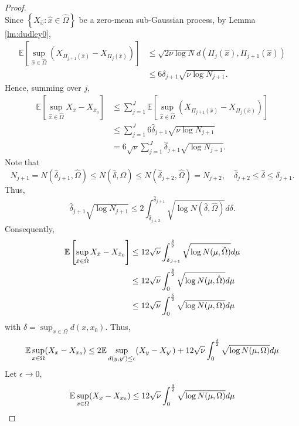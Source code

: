 \begin{proof}
$$$$
Since $\left\{X_{\hat x}: \hat x \in \hat \Omega\right\}$ be a zero-mean sub-Gaussian process, by Lemma \ref{lm:dudley0},
\begin{equation}
\begin{split}
\mathbb{E}\left [ \sup_{\hat x\in \hat \Omega} (X_{\Pi_{j+1} (\hat x)} - X_{\Pi_j (\hat x)})\right]
&\le \sqrt{2 \nu \log N}d(\Pi_j(\hat x), \Pi_{j+1}(\hat x)) 
\\
&\le 6\delta_{j+1}\sqrt{\nu \log N_{j+1}}.
\end{split}
\end{equation}
Hence, summing over $j$,
\begin{equation}
\begin{split}
\mathbb{E}\left [ \sup_{\hat x\in \hat \Omega} X_{\hat x} - X_{\hat x_0}\right]
&\le \sum_{j=1}^J \mathbb{E}\left [ \sup_{\hat x\in\hat  \Omega} (X_{\Pi_{j+1} (\hat x)} - X_{\Pi_j (\hat x)})\right]
\\
&\le \sum_{j=1}^J 6\hat \delta_{j+1}\sqrt{\nu \log N_{j+1}}
\\
& = 6\sqrt{\nu}\sum_{j=1}^J \hat \delta_{j+1}\sqrt{\log N_{j+1}}.
\end{split}
\end{equation}
Note that 
\begin{equation}
N_{j+1}=N(\hat \delta_{j+1}, \hat \Omega)\le N(\hat \delta, \hat \Omega) \le N(\hat{\delta}_{j+2}, \hat \Omega)=N_{j+2},\quad \hat \delta_{j+2}\le \hat \delta \le \delta_{j+1}.
\end{equation}
Thus,
\begin{equation}
\hat \delta_{j+1}\sqrt{\log N_{j+1}}\le 2\int^{\hat \delta_{j+1}}_{\hat \delta_{j+2}} \sqrt{ \log N(\hat \delta, \hat \Omega) }d\delta.
\end{equation}
Consequently,
\begin{equation}
\begin{split}
\mathbb{E}\left [ \sup_{\hat x\in \hat \Omega} X_{\hat x} - X_{\hat x_0}\right]
&\le 12\sqrt{\nu} \int^{\hat \delta\over 2}_{\hat \delta_{J+1}}\sqrt{\log N(\mu, \hat \Omega) }d\mu
\\
&\le 12\sqrt{\nu} \int^{\hat \delta\over 2}_{0}\sqrt{\log N(\mu, \hat \Omega) }d\mu
\\
&\leq 12\sqrt{\nu}\int_{0}^{\delta\over 2} \sqrt{\log N(\mu, \Omega)} d \mu
\end{split}
\end{equation}  
with   $\displaystyle \delta=\sup_{x\in  \Omega} d(x, x_0)$.  
Thus,
\begin{equation}
\mathbb{E}\sup_{x\in \Omega} (X_{x} - X_{x_0})
\leq 2\mathbb{E}\sup_{d(y,y')\le \epsilon} (X_y - X_{y'}) + 12\sqrt{\nu}\int_{0}^{\delta\over 2} \sqrt{\log N(\mu,\Omega)} d \mu
\end{equation}
Let $\epsilon\rightarrow 0$,
\begin{equation}
\mathbb{E}\sup_{x\in\Omega} (X_{x} - X_{x_0})
\leq 12\sqrt{\nu}\int_{0}^{\delta\over 2} \sqrt{\log N(\mu,\Omega)} d \mu
\end{equation}
\end{proof}



